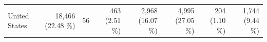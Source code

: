 \begin{table}[tb]
\begin{tabular}{@{} l r r r r rrr @{}}
United States&18,466 (22.48 \%) & 56 & 463 (2.51 \%) & 2,968 (16.07 \%) & 4,995 (27.05 \%) & 204 (1.10 \%) & 1,744 (9.44 \%)\\

\end{tabular}
\end{table}
